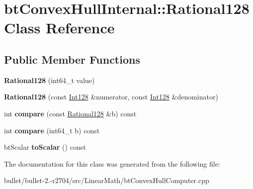 \hypertarget{classbt_convex_hull_internal_1_1_rational128}{\section{bt\+Convex\+Hull\+Internal\+:\+:Rational128 Class Reference}
\label{classbt_convex_hull_internal_1_1_rational128}
}
\subsection*{Public Member Functions}
\begin{DoxyCompactItemize}
\item 
\hypertarget{classbt_convex_hull_internal_1_1_rational128_a63195d24933e0fd0816904d48a93046c}{{\bfseries Rational128} (int64\+\_\+t value)}\label{classbt_convex_hull_internal_1_1_rational128_a63195d24933e0fd0816904d48a93046c}

\item 
\hypertarget{classbt_convex_hull_internal_1_1_rational128_a3975f5b5195d5f5ab19fdb52c9f6dba9}{{\bfseries Rational128} (const \hyperlink{classbt_convex_hull_internal_1_1_int128}{Int128} \&numerator, const \hyperlink{classbt_convex_hull_internal_1_1_int128}{Int128} \&denominator)}\label{classbt_convex_hull_internal_1_1_rational128_a3975f5b5195d5f5ab19fdb52c9f6dba9}

\item 
\hypertarget{classbt_convex_hull_internal_1_1_rational128_a2f4a71bc1f24d1bca1f6805d8567b631}{int {\bfseries compare} (const \hyperlink{classbt_convex_hull_internal_1_1_rational128}{Rational128} \&b) const }\label{classbt_convex_hull_internal_1_1_rational128_a2f4a71bc1f24d1bca1f6805d8567b631}

\item 
\hypertarget{classbt_convex_hull_internal_1_1_rational128_aba0d83dbf6d380bef9d67924a620a3e0}{int {\bfseries compare} (int64\+\_\+t b) const }\label{classbt_convex_hull_internal_1_1_rational128_aba0d83dbf6d380bef9d67924a620a3e0}

\item 
\hypertarget{classbt_convex_hull_internal_1_1_rational128_ae3795ce08ec20fc89ecc5d4ebecb2e0a}{bt\+Scalar {\bfseries to\+Scalar} () const }\label{classbt_convex_hull_internal_1_1_rational128_ae3795ce08ec20fc89ecc5d4ebecb2e0a}

\end{DoxyCompactItemize}


The documentation for this class was generated from the following file\+:\begin{DoxyCompactItemize}
\item 
bullet/bullet-\/2.-\/r2704/src/\+Linear\+Math/bt\+Convex\+Hull\+Computer.\+cpp\end{DoxyCompactItemize}
